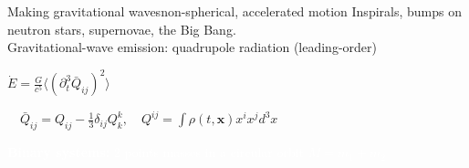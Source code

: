 \documentclass[xcolor=dvipsnames,t]{beamer}
\newcommand{\f}{\frac}
\begin{document}
 \begin{frame}{Making gravitational waves}{non-spherical, accelerated motion}
  \alert{Inspirals}, bumps on neutron stars, supernovae, the Big Bang. \\%
  Gravitational-wave emission: \alert{quadrupole} radiation (leading-order)
  \begin{center} $ \boxed{\dot{E} = \f{G}{c^5} \langle (\partial_t^3 \bar{Q}_{ij})^2 \rangle}$\\
  \vspace{2mm}
  \begin{small}$ \quad \bar{Q}_{ij} = Q_{ij}-\frac{1}{3}\delta_{ij}Q^k_k, \quad Q^{ij} = \int \rho(t,{\mathbf x})x^i x^j d^3 x $ \end{small} \end{center}
  \textcolor{white}{{\bf Binary systems:} 2 points masses in a circular orbit $M=m_1+m_2$}
\end{frame}
\end{document}

